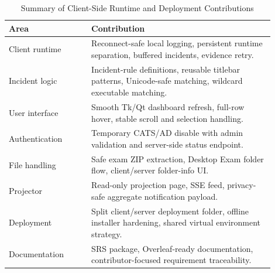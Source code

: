 \begin{table}[htbp]
\caption{Summary of Client-Side Runtime and Deployment Contributions}
\centering
\begin{tabular}{p{0.28\linewidth} p{0.62\linewidth}}
\toprule
\textbf{Area} & \textbf{Contribution} \\
\midrule
Client runtime & Reconnect-safe local logging, persistent runtime separation, buffered incidents, evidence retry. \\
Incident logic & Incident-rule definitions, reusable titlebar patterns, Unicode-safe matching, wildcard executable matching. \\
User interface & Smooth Tk/Qt dashboard refresh, full-row hover, stable scroll and selection handling. \\
Authentication & Temporary CATS/AD disable with admin validation and server-side status endpoint. \\
File handling & Safe exam ZIP extraction, Desktop Exam folder flow, client/server folder-info UI. \\
Projector & Read-only projection page, SSE feed, privacy-safe aggregate notification payload. \\
Deployment & Split client/server deployment folder, offline installer hardening, shared virtual environment strategy. \\
Documentation & SRS package, Overleaf-ready documentation, contributor-focused requirement traceability. \\
\bottomrule
\end{tabular}
\label{tab:client-runtime-contrib}
\end{table}

